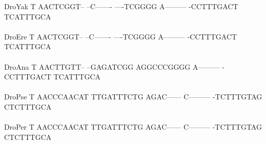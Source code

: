 \documentclass[11pt,twoside,reqno,a4paper]{article}
\begin{document}
{DroYak	T	AACTCGGT--	--C-------	----TCGGGG	A---------	-CCTTTGACT	TCATTTGCA\\
\hspace*{7\charwidth}\hspace*{1\charwidth}\hspace*{1\charwidth}\hspace*{1\charwidth}\hspace*{1\charwidth}\hspace*{1\charwidth}\hspace*{1\charwidth}\\
DroEre	T	AACTCGGT--	--C-------	----TCGGGG	A---------	-CCTTTGACT	TCATTTGCA\\
\hspace*{7\charwidth}\hspace*{1\charwidth}\hspace*{1\charwidth}\hspace*{1\charwidth}\hspace*{1\charwidth}\hspace*{1\charwidth}\hspace*{1\charwidth}\\
DroAna	T	AACTTGTT--	--GAGATCGG	AGGCCCGGGG	A---------	-CCTTTGACT	TCATTTGCA\\
\hspace*{7\charwidth}\hspace*{1\charwidth}\hspace*{1\charwidth}\hspace*{1\charwidth}\hspace*{1\charwidth}\hspace*{1\charwidth}\hspace*{1\charwidth}\\
DroPse	T	AACCCAACAT	TTGATTTCTG	AGAC------	C---------	-TCTTTGTAG	CTCTTTGCA\\
\hspace*{7\charwidth}\hspace*{1\charwidth}\hspace*{1\charwidth}\hspace*{1\charwidth}\hspace*{1\charwidth}\hspace*{1\charwidth}\hspace*{1\charwidth}\\
DroPer	T	AACCCAACAT	TTGATTTCTG	AGAC------	C---------	-TCTTTGTAG	CTCTTTGCA\\
\hspace*{7\charwidth}\hspace*{1\charwidth}\hspace*{1\charwidth}\hspace*{1\charwidth}\hspace*{1\charwidth}\hspace*{1\charwidth}\hspace*{1\charwidth}\\
}
\end{document}
